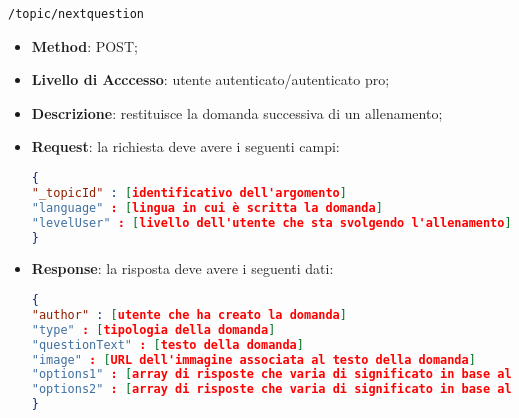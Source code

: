 \item \texttt{/topic/nextquestion}
		\begin{itemize}
			\item \textbf{Method}: POST;
			\item \textbf{Livello di Acccesso}: utente autenticato/autenticato pro;
			\item \textbf{Descrizione}: restituisce la domanda successiva di un allenamento;
			\item \textbf{Request}: la richiesta deve avere i seguenti campi:
\begin{lstlisting}[language=json,firstnumber=1]
{
"_topicId" : [identificativo dell'argomento]
"language" : [lingua in cui è scritta la domanda]
"levelUser" : [livello dell'utente che sta svolgendo l'allenamento]
}
\end{lstlisting}
			\item \textbf{Response}: la risposta deve avere i seguenti dati:
\begin{lstlisting}[language=json,firstnumber=1]
{
"author" : [utente che ha creato la domanda]
"type" : [tipologia della domanda]
"questionText" : [testo della domanda]
"image" : [URL dell'immagine associata al testo della domanda]
"options1" : [array di risposte che varia di significato in base alla tipologia della domanda]
"options2" : [array di risposte che varia di significato in base alla tipologia della domanda]
}
\end{lstlisting}
		\end{itemize}